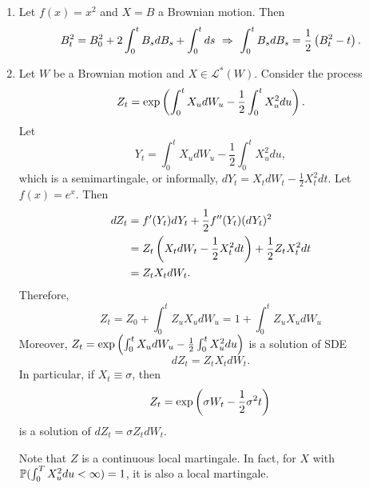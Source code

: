 \begin{exam}
    \begin{enumerate}[label=(\arabic*)]
        \item Let $f(x) = x^2$ and $X=B$ a Brownian motion. Then
        \begin{equation*}
            B_t^2 = B_0^2 + 2\int_0^t B_s dB_s + \int_0^tds~\Rightarrow~ \int_0^t B_s dB_s = \frac{1}{2}\left(B_t^2 - t\right).
        \end{equation*}

        \item Let $W$ be a Brownian motion and $X \in \mathcal{L}^*(W)$. Consider the process
        \begin{equation*}
            Z_t = \exp\left(\int_0^t X_u dW_u - \frac{1}{2}\int_0^tX_u^2 du\right).
        \end{equation*}
        Let
        \begin{equation*}
            Y_t = \int_0^t X_u dW_u - \frac{1}{2}\int_0^tX_u^2 du,
        \end{equation*}
        which is a semimartingale, or informally, $dY_t = X_t dW_t - \frac{1}{2}X_t^2 dt$. Let $f(x) = e^x$. Then
        \begin{align*}
            dZ_t &= f^\prime(Y_t)dY_t + \frac{1}{2}f^{\prime\prime}(Y_t)(dY_t)^2 \\
            &= Z_t \left(X_t dW_t - \frac{1}{2}X_t^2 dt\right) + \frac{1}{2}Z_t X_t^2 dt \\
            &= Z_tX_t dW_t.
        \end{align*}
        Therefore, 
        \begin{equation*}
            Z_t = Z_0 + \int_0^t Z_uX_u dW_u = 1+ \int_0^t Z_uX_u dW_u
        \end{equation*}
        Moreover, $Z_t = \exp\left(\int_0^t X_u dW_u - \frac{1}{2}\int_0^tX_u^2 du\right)$ is a solution of SDE
        \begin{equation*}
            dZ_t = Z_tX_t dW_t.
        \end{equation*}
        In particular, if $X_t \equiv \sigma$, then
        \begin{equation*}
            Z_t = \exp\left(\sigma W_t - \frac{1}{2}\sigma^2 t\right)
        \end{equation*}
        is a solution of $dZ_t = \sigma Z_tdW_t$.
        \begin{rmk}
            Note that $Z$ is a continuous local martingale. In fact, for $X$ with $\mathbb{P}(\int_0^TX_u^2du < \infty) = 1$, it is also a local martingale.
        \end{rmk}
    \end{enumerate}
\end{exam}

